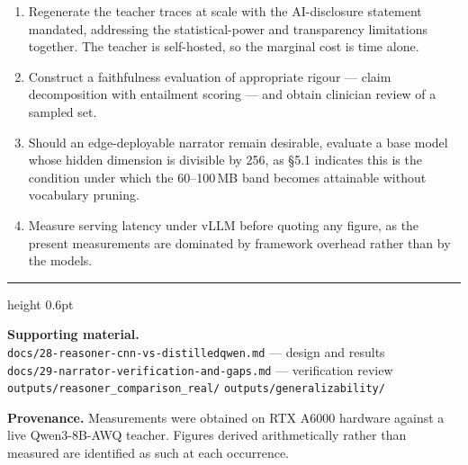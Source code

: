 \documentclass[11pt,a4paper]{article}
\newcommand{\code}[1]{\texttt{\small #1}}
\begin{document}
\begin{enumerate}[leftmargin=*,itemsep=3pt]
\item Regenerate the teacher traces at scale with the AI-disclosure statement
mandated, addressing the statistical-power and transparency limitations together.
The teacher is self-hosted, so the marginal cost is time alone.
\item Construct a faithfulness evaluation of appropriate rigour --- claim
decomposition with entailment scoring --- and obtain clinician review of a
sampled set.
\item Should an edge-deployable narrator remain desirable, evaluate a base model
whose hidden dimension is divisible by 256, as \S5.1 indicates this is the
condition under which the 60--100\,MB band becomes attainable without vocabulary
pruning.
\item Measure serving latency under vLLM before quoting any figure, as the
present measurements are dominated by framework overhead rather than by the
models.
\end{enumerate}

\vspace{14pt}
{\color{ruleGrey}\hrule height 0.6pt}
\vspace{6pt}

{\footnotesize\sffamily\color{inkMuted}\setlength{\parskip}{3pt}
\textbf{Supporting material.}\\
\code{docs/28-reasoner-cnn-vs-distilledqwen.md} --- design and results\\
\code{docs/29-narrator-verification-and-gaps.md} --- verification review\\
\code{outputs/reasoner\_comparison\_real/} \quad \code{outputs/generalizability/}

\textbf{Provenance.} Measurements were obtained on RTX A6000 hardware against a
live Qwen3-8B-AWQ teacher. Figures derived arithmetically rather than measured
are identified as such at each occurrence.\par}
\end{document}
